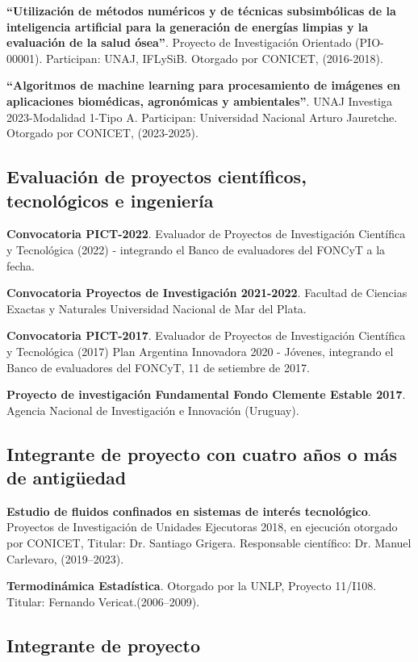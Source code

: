 \documentclass[margin,line]{res}
\begin{document}
\begin{resume}
\textbf{``Utilización de métodos numéricos y de técnicas subsimbólicas de la inteligencia artificial para la generación de energías  limpias y la evaluación de la salud ósea''}. Proyecto de Investigación Orientado (PIO-00001). Participan: UNAJ, IFLySiB. Otorgado por CONICET, (2016-2018).

\textbf{``Algoritmos de machine learning para procesamiento de imágenes en aplicaciones biomédicas, agronómicas y ambientales''}. UNAJ Investiga 2023-Modalidad 1-Tipo A. Participan: Universidad Nacional Arturo Jauretche. Otorgado por CONICET, (2023-2025).

\subsection{ Evaluación de proyectos científicos, tecnológicos e ingeniería}

{\bf Convocatoria PICT-2022}. Evaluador de Proyectos de Investigación Científica y Tecnológica (2022) - integrando el Banco de evaluadores del FONCyT a la fecha.

{\bf Convocatoria Proyectos de Investigación 2021-2022}. Facultad de Ciencias Exactas y Naturales Universidad Nacional de Mar del Plata.

{\bf Convocatoria PICT-2017}. Evaluador de Proyectos de Investigación Científica y Tecnológica (2017) Plan Argentina Innovadora 2020 - Jóvenes, integrando el Banco de evaluadores del FONCyT, 11 de setiembre de 2017.

{\bf Proyecto de investigación Fundamental Fondo Clemente Estable 2017}. Agencia Nacional de Investigación e Innovación (Uruguay).
%

\subsection{ Integrante de proyecto con cuatro años o más de antigüedad}

\textbf{Estudio de fluidos confinados en sistemas de interés tecnológico}. Proyectos de Investigación de Unidades Ejecutoras 2018, en ejecución otorgado por CONICET, Titular: Dr. Santiago Grigera. Responsable científico: Dr. Manuel Carlevaro, (2019--2023). 

\textbf{Termodinámica Estadística}. Otorgado por la UNLP, Proyecto 11/I108. Titular: Fernando Vericat.(2006--2009).

\subsection{ Integrante de proyecto}


\end{resume}
\end{document}
